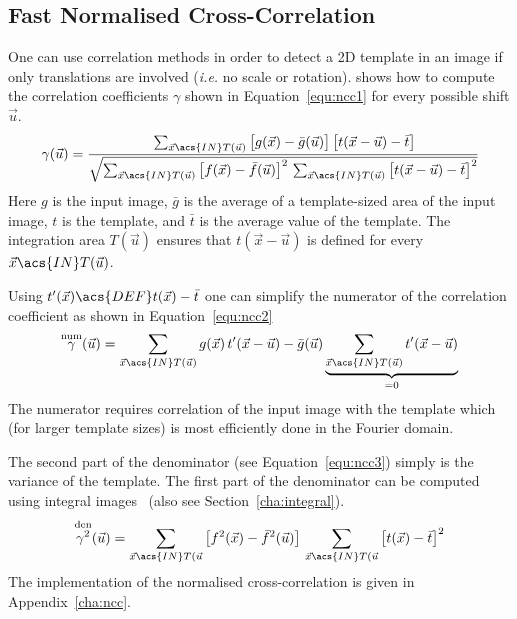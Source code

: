 \documentclass[12pt,a4paper,oneside,openright]{book}
\newcommand{\ie}{\emph{i.e.} }
\newcommand{\sct}[1]{Section~\ref{cha:#1}}
\newcommand{\equ}[1]{Equation~\ref{equ:#1}}
\newcommand{\anx}[1]{Appendix~\ref{cha:#1}}
\begin{document}
\begin{CJK}{UTF8}{}
\subsection{Fast Normalised Cross-Correlation}
One can use correlation methods in order to detect a \ac{2D} template in an image if only translations are involved (\ie no scale or rotation). \citet{lewis1995fast} shows how to compute the correlation coefficients $\gamma$ shown in \equ{ncc1} for every possible shift $\vec{u}$.
\begin{equation}\label{equ:ncc1}
  \gamma(\vec{u})=\cfrac{\sum_{\vec{x}\acs{IN}T(\vec{u})}\big[g(\vec{x})-\bar{g}(\vec{u})\big]\,\big[t(\vec{x}-\vec{u})-\bar{t}\big]}{\sqrt{\sum_{\vec{x}\acs{IN}T(\vec{u})}\big[f(\vec{x})-\bar{f}(\vec{u})\big]^2\,\sum_{\vec{x}\acs{IN}T(\vec{u})}\big[t(\vec{x}-\vec{u})-\bar{t}\big]^2}}
\end{equation}
Here $g$ is the input image, $\bar{g}$ is the average of a template-sized area of the input image, $t$ is the template, and $\bar{t}$ is the average value of the template. The integration area $T(\vec{u})$ ensures that $t(\vec{x}-\vec{u})$ is defined for every $\vec{x}\acs{IN}T(\vec{u})$.

Using $t^\prime(\vec{x})\acs{DEF}t(\vec{x})-\bar{t}$ one can simplify the numerator of the correlation coefficient as shown in \equ{ncc2}
\begin{equation}\label{equ:ncc2}
  \overset{\operatorname{num}}{\gamma}(\vec{u})=\sum_{\vec{x}\acs{IN}T(\vec{u})}g(\vec{x})\,t^\prime(\vec{x}-\vec{u})-\bar{g}(\vec{u})\underbrace{\sum_{\vec{x}\acs{IN}T(\vec{u})}t^\prime(\vec{x}-\vec{u})}_{=0}
\end{equation}
The numerator requires correlation of the input image with the template which (for larger template sizes) is most efficiently done in the Fourier domain.

The second part of the denominator (see \equ{ncc3}) simply is the variance of the template. The first part of the denominator can be computed using integral images~\citep{lewis1995fast} (also see \sct{integral}).
\begin{equation}\label{equ:ncc3}
  \overset{\operatorname{den}}{\gamma^2}(\vec{u})=\sum_{\vec{x}\acs{IN}T(\vec{u}}\big[f^2(\vec{x})-\bar{f}^2(\vec{u})\big]\,\sum_{\vec{x}\acs{IN}T(\vec{u}}\big[t(\vec{x})-\bar{t}\big]^2
\end{equation}
The implementation of the normalised cross-correlation is given in \anx{ncc}.


\end{CJK}
\end{document}
